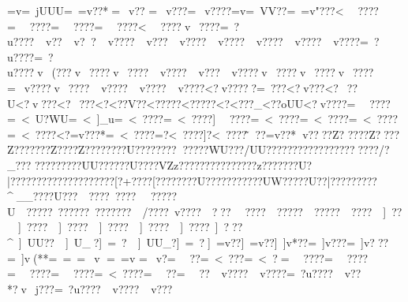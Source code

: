 {{{{{{{{{{{{{{{{{{{{{{{{{{{{{{{{{{{{{{{{{{{{{{{{{{{{{{{{{{{{{{{{{{{{{{{{{{{{{{{{{{{{{{{{{{{{{{{{{{{{{{{{{{{{{{{{{{{{{{{{{{{{{{{{{{{{{{{{{{{{{{{{{{{{{{{{{{{{{{{{{{{{{{{{{{{{{{{{{{{{{{{{{{{{{{{{{{{{{{{{{{{{{{{{{{{{{{{{{{{{{{{{{{{{{{{{{{{{{{{{{{{{{{{{{{{{{{{{{{{{{{{{{{{{{{{{{{{{{{{{{{{{{{{{{{{{{{{{{{{{{{{{{{{{{{{{{{{{{{{{{{{{{{{{{{{{{{{{{{{{{{{{{{{{{{{{{{{{{{{{{{{{{{{{{{{{{{{{{{{{{{{{{{{{{{{{{{{{{{{{{{{{{{{{{{{{{{{{{{{{{{{{{{{{{{{{{{{{{{{{{{{{{{{{{{{{{{{{{{{{{{{{{{{{{{{{{{{{{{{{{{{{{{{{{{{{{{{{{{{{{{{{{{{{{{{{{{{{{{{{{{{{{{{{{{{{{{{{{{{{{{{{{{{{{{{{{{{{{{{{{{{{{{{{{{{{{{{{{{{{{{{{{{{{{{{{{{{{{{{{{{{{{{{{{{{{{{{{{{{{{{{{{{{{{{{{{{{{{{{{{{{{{{{{{{{{{{{{{{{{{{{{{{{{{{{{{{{{{{{{{{{{{{{{{{{{{{{{{{{{{{{{{{{{{{{{{{{{{{{{{{{{{{{{{{{{{{{{{{{{{{{{{{{{{{{{{{{{{{{{{{{{{{{{{{{{{{{{{{{{{{{{{{{{{{{{{{{{{{{{{{{{{{{{{{{{{{{{{{{{{{{{{{{{{{{{{{{{{{{{{{{{{{{{{{{{{{{{{{{{{{{{{{{{{{{{{{{{{{{{{{{{{{{{{{{{{{{{{{{{{{{{{{{{{{{{{{{{{{{{{{{{{{{{{{{{{{{{{{{{{{{{{{{{{{{{{{{{{{{{{{{{{{{{{{{{{{{{{{{{{{{{{{{{{{{{{{{{{{{{{{{{{{{{{{{{{{{{{{  =v=~jUUU=~=v??*=~v??  =~v??? =~v????=v=~VV??=~=v"???<~~????=~~????=~~????=~~????<~~????v~????=~?u????~v??~v??~v????~v???~v????~v????~v????~v????~v????=~?u????=~?u????v~(???v~????v~????~v????~v???~v????v~????v~????v~????=~v????v~????~v????~v????~v????<?v?????=~ ???<?v ???<?~ ??U<?v???<?~ ???<?<??V??\?<?????<?\?????<?<? ??_\?<??oUU<?v????=~~????=~<~U?WU=~<~]_u}=~<~????=~<~????]~~????=~<~????=~<~????=~<~????=~<~????<?=v???*=~<~????=?<~????]?<~????\~~??  \?=v??*\?v?? ??Z? 
????Z?  ???Z???????Z? ???Z?????{???U?????{?????{???WU??{? /UU??{?????{???????{??????{? /?_??{?
?????????UU??????U????VZz???????????????z?{??????U{?|?????{???????{?{???????[? +????[?  ????{? ??U??{? ?????{???UW??{???U}??|?????????^__????U???~~????~???? ~~?????U~~}?????~?}?????~?}?????}?~~/???}?~v ???}?~~??}?~~???}?~~????}?~~????}?~~????~~]~??~~]~????~~]~????~~]~????~~]~????~~]~????}~]~???^~]~UU??~~]~U_?]~=~?   ~~]~UU_?]~=~?  ]~=v??  ]~=v??  ]~]v*?? =~]v ???=~]v???=~]v(**=~=~    =~v   =~=v    =~v?   =~~??  =~<~??? =~<~?=~~????=~~????=~~????=~~????=~<~????=~~??=~~??~v????~v????=~?u????~v??*?v~j???=~?u????~v????~v???
}}}}}}}}}}}}}}}}}}}}}}}}}}}}}}}}}}}}}}}}}}}}}}}}}}}}}}}}}}}}}}}}}}}}}}}}}}}}}}}}}}}}}}}}}}}}}}}}}}}}}}}}}}}}}}}}}}}}}}}}}}}}}}}}}}}}}}}}}}}}}}}}}}}}}}}}}}}}}}}}}}}}}}}}}}}}}}}}}}}}}}}}}}}}}}}}}}}}}}}}}}}}}}}}}}}}}}}}}}}}}}}}}}}}}}}}}}}}}}}}}}}}}}}}}}}}}}}}}}}}}}}}}}}}}}}}}}}}}}}}}}}}}}}}}}}}}}}}}}}}}}}}}}}}}}}}}}}}}}}}}}}}}}}}}}}}}}}}}}}}}}}}}}}}}}}}}}}}}}}}}}}}}}}}}}}}}}}}}}}}}}}}}}}}}}}}}}}}}}}}}}}}}}}}}}}}}}}}}}}}}}}}}}}}}}}}}}}}}}}}}}}}}}}}}}}}}}}}}}}}}}}}}}}}}}}}}}}}}}}}}}}}}}}}}}}}}}}}}}}}}}}}}}}}}}}}}}}}}}}}}}}}}}}}}}}}}}}}}}}}}}}}}}}}}}}}}}}}}}}}}}}}}}}}}}}}}}}}}}}}}}}}}}}}}}}}}}}}}}}}}}}}}}}}}}}}}}}}}}}}}}}}}}}}}}}}}}}}}}}}}}}}}}}}}}}}}}}}}}}}}}}}}}}}}}}}}}}}}}}}}}}}}}}}}}}}}}}}}}}}}}}}}}}}}}}}}}}}}}}}}}}}}}}}}}}}}}}}}}}}}}}}}}}}}}}}}}}}}}}}}}}}}}}}}}}}}}}}}}}}}}}}}}}}}}}}}}}}}}}}}}}}}}}}}}}}}}}}}}}}}}}}}}}}}}}}}}}}}}}}}}}}}}}}}}}}}}}}}}}}}}}}}}}}}}}}}}}}}}}}}}}}}}}}}}}}}}}}}}}}}}}}}}}}}}}}}}}}}}}}}}}}}}}}}}}}}}}}}}}}}}}}}}}}}}}}}}}}}}}}}}}}}}}}}}}}}}}}}}}}}}}}}}}}}}}}}}}}}}}}}}}}}}}}}}}}}}}}}}}}}}}
